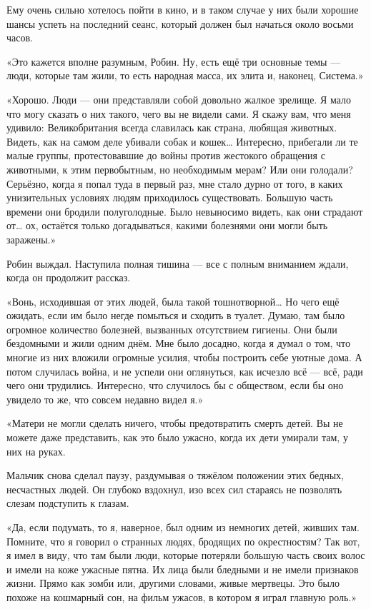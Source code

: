 \documentclass[a5paper, 9pt,
final, openany, twoside=true]{memoir}
\begin{document}
Ему очень сильно хотелось пойти в кино, и в таком случае у них были хорошие шансы успеть на последний сеанс, который должен был начаться около восьми часов.

«Это кажется вполне разумным, Робин. Ну, есть ещё три основные темы — люди, которые там жили, то есть народная масса, их элита и, наконец, Система.»

«Хорошо. Люди — они представляли собой довольно жалкое зрелище. Я мало что могу сказать о них такого, чего вы не видели сами. Я скажу вам, что меня удивило: Великобритания всегда славилась как страна, любящая животных. Видеть, как на самом деле убивали собак и кошек… Интересно, прибегали ли те малые группы, протестовавшие до войны против жестокого обращения с животными, к этим первобытным, но необходимым мерам? Или они голодали? Серьёзно, когда я попал туда в первый раз, мне стало дурно от того, в каких унизительных условиях людям приходилось существовать. Большую часть времени они бродили полуголодные. Было невыносимо видеть, как они страдают от… ох, остаётся только догадываться, какими болезнями они могли быть заражены.»

Робин выждал. Наступила полная тишина — все с полным вниманием ждали, когда он продолжит рассказ.

«Вонь, исходившая от этих людей, была такой тошнотворной… Но чего ещё ожидать, если им было негде помыться и сходить в туалет. Думаю, там было огромное количество болезней, вызванных отсутствием гигиены. Они были бездомными и жили одним днём. Мне было досадно, когда я думал о том, что многие из них вложили огромные усилия, чтобы построить себе уютные дома. А потом случилась война, и не успели они оглянуться, как исчезло всё — всё, ради чего они трудились. Интересно, что случилось бы с обществом, если бы оно увидело то же, что совсем недавно видел я.»

«Матери не могли сделать ничего, чтобы предотвратить смерть детей. Вы не можете даже представить, как это было ужасно, когда их дети умирали там, у них на руках.

Мальчик снова сделал паузу, раздумывая о тяжёлом положении этих бедных, несчастных людей. Он глубоко вздохнул, изо всех сил стараясь не позволять слезам подступить к глазам.

«Да, если подумать, то я, наверное, был одним из немногих детей, живших там. Помните, что я говорил о странных людях, бродящих по окрестностям? Так вот, я имел в виду, что там были люди, которые потеряли большую часть своих волос и имели на коже ужасные пятна. Их лица были бледными и не имели признаков жизни. Прямо как зомби или, другими словами, живые мертвецы. Это было похоже на кошмарный сон, на фильм ужасов, в котором я играл главную роль.»
\end{document}
